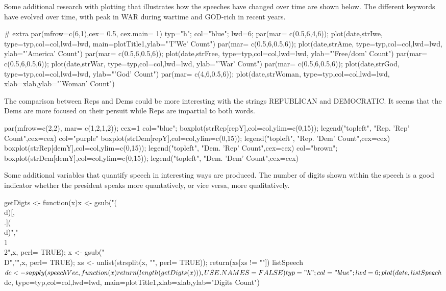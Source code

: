 \documentclass{article}
\begin{document}
\newpage
Some additional research with plotting that illustrates how the speeches have changed over time are shown below.
The different keywords have evolved over time, with peak in WAR during wartime and GOD-rich in recent years.


# extra
par(mfrow=c(6,1),cex= 0.5, cex.main= 1)
typ="h"; col="blue"; lwd=6;
par(mar= c(0.5,6,4,6)); plot(date,strIwe, type=typ,col=col,lwd=lwd, main=plotTitle1,ylab="'I''We' Count")
par(mar= c(0.5,6,0.5,6)); plot(date,strAme, type=typ,col=col,lwd=lwd, ylab="'America' Count")
par(mar= c(0.5,6,0.5,6)); plot(date,strFree, type=typ,col=col,lwd=lwd, ylab="'Free/dom' Count")
par(mar= c(0.5,6,0.5,6)); plot(date,strWar, type=typ,col=col,lwd=lwd, ylab="'War' Count")
par(mar= c(0.5,6,0.5,6)); plot(date,strGod, type=typ,col=col,lwd=lwd, ylab="'God' Count") 
par(mar= c(4,6,0.5,6)); plot(date,strWoman, type=typ,col=col,lwd=lwd, xlab=xlab,ylab="'Woman' Count")

The comparison between Reps and Dems could be more interesting with the strings REPUBLICAN and DEMOCRATIC.
It seems that the Dems are more focused on their persuit while Reps are impartial to both words.

par(mfrow=c(2,2), mar= c(1,2,1,2)); cex=1
col="blue";
boxplot(strRep[repY],col=col,ylim=c(0,15)); legend("topleft", "Rep. 'Rep' Count",cex=cex)
col="purple"
boxplot(strDem[repY],col=col,ylim=c(0,15)); legend("topleft", "Rep. 'Dem' Count",cex=cex)
boxplot(strRep[demY],col=col,ylim=c(0,15)); legend("topleft", "Dem. 'Rep' Count",cex=cex)
col="brown";
boxplot(strDem[demY],col=col,ylim=c(0,15)); legend("topleft", "Dem. 'Dem' Count",cex=cex)


Some additional variables that quantify speech in interesting ways are produced. The number of digits shown within the
speech is a good indicator whether the president speaks more quantatively, or vice versa, more qualitatively.

getDigts <- function(x){x <- gsub("(\\d)[,\\.](\\d)","\\1\\2",x, perl= TRUE);
                        x <- gsub("\\D","\n",x, perl= TRUE);
                        xs <- unlist(strsplit(x, "\n", perl= TRUE));
                        return(xs[xs != ""])}
listSpeech$dc <- sapply(speechVec, function(x){return(length(getDigts(x)))}, USE.NAMES= FALSE)
typ="h"; col="blue"; lwd=6; 
plot(date,listSpeech$dc, type=typ,col=col,lwd=lwd, main=plotTitle1,xlab=xlab,ylab="Digits Count")
\end{document}
